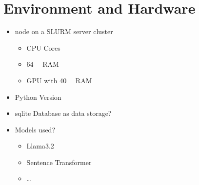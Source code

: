 \section{Environment and Hardware}
\label{sec:experiment_setup:environment_hardware}

\begin{itemize}
  \item node on a SLURM server cluster
        \begin{itemize}
          \item CPU Cores
          \item \SI{64}{\giga\byte} RAM
          \item GPU with \SI{40}{\giga\byte} RAM
        \end{itemize}
  \item Python Version
  \item sqlite Database as data storage?
  \item Models used?
        \begin{itemize}
          \item Llama3.2
          \item Sentence Transformer
          \item \ldots
        \end{itemize}
\end{itemize}